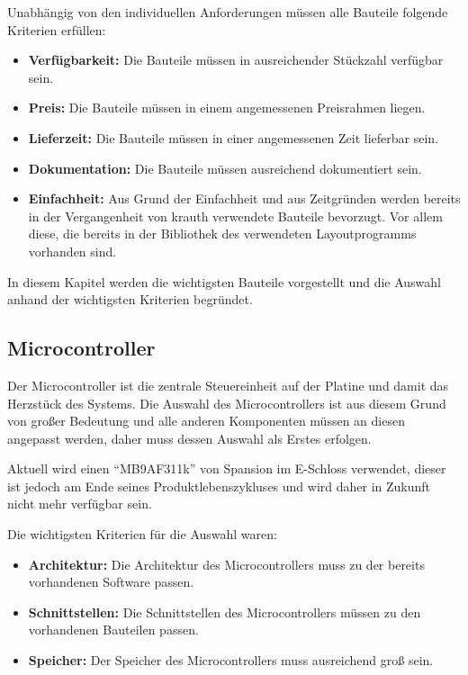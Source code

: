 Unabhängig von den individuellen Anforderungen müssen alle Bauteile folgende Kriterien erfüllen:
\begin{itemize}
    \item \textbf{Verfügbarkeit:} Die Bauteile müssen in ausreichender Stückzahl verfügbar sein.
    \item \textbf{Preis:} Die Bauteile müssen in einem angemessenen Preisrahmen liegen.
    \item \textbf{Lieferzeit:} Die Bauteile müssen in einer angemessenen Zeit lieferbar sein.
    \item \textbf{Dokumentation:} Die Bauteile müssen ausreichend dokumentiert sein.
    \item \textbf{Einfachheit:} Aus Grund der Einfachheit und aus Zeitgründen werden bereits in
          der Vergangenheit von krauth verwendete Bauteile bevorzugt. Vor allem diese, die bereits in
          der Bibliothek des verwendeten Layoutprogramms vorhanden sind.
\end{itemize}

In diesem Kapitel werden die wichtigsten Bauteile vorgestellt und die Auswahl anhand der wichtigsten Kriterien begründet.

\subsection{Microcontroller}
Der Microcontroller ist die zentrale Steuereinheit auf der Platine und damit das Herzstück des Systems. Die Auswahl
des Microcontrollers ist aus diesem Grund von großer Bedeutung und alle anderen Komponenten müssen an diesen
angepasst werden, daher muss dessen Auswahl als Erstes erfolgen.

Aktuell wird einen \enquote{MB9AF311k} von Spansion im E-Schloss verwendet, dieser ist jedoch am Ende seines
Produktlebenszykluses und wird daher in Zukunft nicht mehr verfügbar sein.

Die wichtigsten Kriterien für die Auswahl waren:
\begin{itemize}
    \item \textbf{Architektur:} Die Architektur des Microcontrollers muss zu der bereits vorhandenen Software passen.
    \item \textbf{Schnittstellen:} Die Schnittstellen des Microcontrollers müssen zu den vorhandenen Bauteilen passen.
    \item \textbf{Speicher:} Der Speicher des Microcontrollers muss ausreichend groß sein.
\end{itemize}

